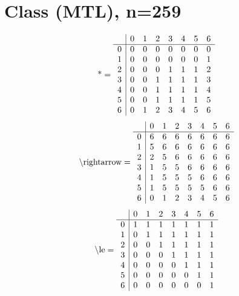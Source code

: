 \documentclass[11pt]{article}
\begin{document}
\section{Class (MTL), n=259}
\[\text{*} = 
\begin{array}{r | r r r r r r r}
 & 0 & 1 & 2 & 3 & 4 & 5 & 6 \\ \hline
0 & 0 & 0 & 0 & 0 & 0 & 0 & 0 \\
1 & 0 & 0 & 0 & 0 & 0 & 0 & 1 \\
2 & 0 & 0 & 0 & 1 & 1 & 1 & 2 \\
3 & 0 & 0 & 1 & 1 & 1 & 1 & 3 \\
4 & 0 & 0 & 1 & 1 & 1 & 1 & 4 \\
5 & 0 & 0 & 1 & 1 & 1 & 1 & 5 \\
6 & 0 & 1 & 2 & 3 & 4 & 5 & 6 \\
\end{array}
\]
\[\text{\textbackslash rightarrow} = 
\begin{array}{r | r r r r r r r}
 & 0 & 1 & 2 & 3 & 4 & 5 & 6 \\ \hline
0 & 6 & 6 & 6 & 6 & 6 & 6 & 6 \\
1 & 5 & 6 & 6 & 6 & 6 & 6 & 6 \\
2 & 2 & 5 & 6 & 6 & 6 & 6 & 6 \\
3 & 1 & 5 & 5 & 6 & 6 & 6 & 6 \\
4 & 1 & 5 & 5 & 5 & 6 & 6 & 6 \\
5 & 1 & 5 & 5 & 5 & 5 & 6 & 6 \\
6 & 0 & 1 & 2 & 3 & 4 & 5 & 6 \\
\end{array}
\]
\[\text{\textbackslash le} = 
\begin{array}{r | r r r r r r r}
 & 0 & 1 & 2 & 3 & 4 & 5 & 6 \\ \hline
0 & 1 & 1 & 1 & 1 & 1 & 1 & 1 \\
1 & 0 & 1 & 1 & 1 & 1 & 1 & 1 \\
2 & 0 & 0 & 1 & 1 & 1 & 1 & 1 \\
3 & 0 & 0 & 0 & 1 & 1 & 1 & 1 \\
4 & 0 & 0 & 0 & 0 & 1 & 1 & 1 \\
5 & 0 & 0 & 0 & 0 & 0 & 1 & 1 \\
6 & 0 & 0 & 0 & 0 & 0 & 0 & 1 \\
\end{array}
\]
\end{document}
